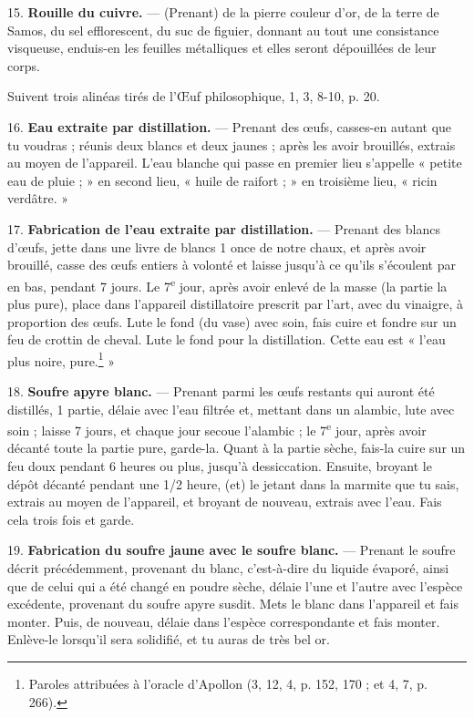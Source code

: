 \documentclass[a4paper, 11pt, oneside, polutonikogreek, french]{article}
\begin{document}
15. \textbf{Rouille du cuivre.} --- (Prenant) de la pierre couleur d'or, de la terre de Samos, du sel efflorescent, du suc de figuier, donnant au tout une consistance visqueuse, enduis-en les feuilles métalliques et elles seront dépouillées de leur corps.

Suivent trois alinéas tirés de l'Œuf philosophique, 1, 3, 8-10, p. 20.

16. \textbf{Eau extraite par distillation.} --- Prenant des œufs, casses-en autant que tu voudras ; réunis deux blancs et deux jaunes ; après les avoir brouillés, extrais au moyen de l'appareil. L'eau blanche qui passe en premier lieu s'appelle « petite eau de pluie ; » en second lieu, « huile de raifort ; » en troisième lieu, « ricin verdâtre. »

17. \textbf{Fabrication de l'eau extraite par distillation.} --- Prenant des blancs d'œufs, jette dans une livre de blancs 1 once de notre chaux, et après avoir brouillé, casse des œufs entiers à volonté et laisse jusqu'à ce qu'ils s'écoulent par en bas, pendant 7 jours. Le 7\textsuperscript{e} jour, après avoir enlevé de la masse (la partie la plus pure), place dans l'appareil distillatoire prescrit par l'art, avec du vinaigre, à proportion des œufs. Lute le fond (du vase) avec soin, fais cuire et fondre sur un feu de crottin de cheval. Lute le fond pour la distillation. Cette eau est « l'eau plus noire, pure.\footnote{Paroles attribuées à l'oracle d'Apollon (3, 12, 4, p. 152, 170 ; et 4, 7, p. 266).} »

18. \textbf{Soufre apyre blanc.} --- Prenant parmi les œufs restants qui auront été distillés, 1 partie, délaie avec l'eau filtrée et, mettant dans un alambic, lute avec soin ; laisse 7 jours, et chaque jour secoue l'alambic ; le 7\textsuperscript{e} jour, après avoir décanté toute la partie pure, garde-la. Quant à la partie sèche, fais-la cuire sur un feu doux pendant 6 heures ou plus, jusqu'à dessiccation. Ensuite, broyant le dépôt décanté pendant une 1/2 heure, (et) le jetant dans la marmite que tu sais, extrais au moyen de l'appareil, et broyant de nouveau, extrais avec l'eau. Fais cela trois fois et garde.

19. \textbf{Fabrication du soufre jaune avec le soufre blanc.} --- Prenant le soufre décrit précédemment, provenant du blanc, c'est-à-dire du liquide évaporé, ainsi que de celui qui a été changé en poudre sèche, délaie l'une et l'autre avec l'espèce excédente, provenant du soufre apyre susdit. Mets le blanc dans l'appareil et fais monter. Puis, de nouveau, délaie dans l'espèce correspondante et fais monter. Enlève-le lorsqu'il sera solidifié, et tu auras de très bel or.
\end{document}
